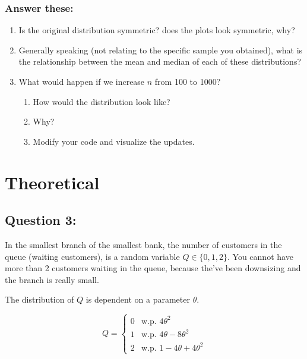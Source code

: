 \documentclass[
]{article}
\providecommand{\tightlist}{%
  \setlength{\itemsep}{0pt}\setlength{\parskip}{0pt}}
\begin{document}
\hypertarget{answer-these}{%
\subsubsection{Answer these:}\label{answer-these}}

\begin{enumerate}
\def\labelenumi{\arabic{enumi}.}
\item
  Is the original distribution symmetric? does the plots look symmetric,
  why?
\item
  Generally speaking (not relating to the specific sample you obtained),
  what is the relationship between the mean and median of each of these
  distributions?
\item
  What would happen if we increase \(n\) from 100 to 1000?

  \begin{enumerate}
  \def\labelenumii{\alph{enumii}.}
  \tightlist
  \item
    How would the distribution look like?
  \item
    Why?
  \item
    Modify your code and visualize the updates.
  \end{enumerate}
\end{enumerate}

\hypertarget{theoretical}{%
\section{Theoretical}\label{theoretical}}

\hypertarget{question-3}{%
\subsection{Question 3:}\label{question-3}}

In the smallest branch of the smallest bank, the number of customers in
the queue (waiting customers), is a random variable \(Q\in\{0,1,2\}\).
You cannot have more than 2 customers waiting in the queue, because
the've been downsizing and the branch is really small.

The distribution of \(Q\) is dependent on a parameter \(\theta\).

\[Q = \left\{\begin{array}{ll}0 & \text{w.p. }4\theta^2\\
1 & \text{w.p. }4\theta-8\theta^2\\
2 & \text{w.p. }1-4\theta+4\theta^2\end{array}\right.\]
\end{document}
